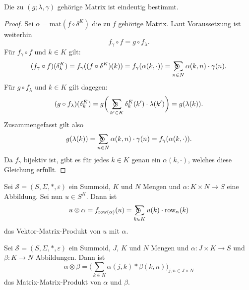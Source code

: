 \documentclass{article}
\DeclareMathOperator*{\sumcirc}{%
  \ThisStyle{\mathop{\ensurestackMath{\stackinset{c}{-1.5\LMpt}{c}{}{%
  \rotatebox[origin=lb]{-90}{$\SavedStyle\scalerel*{\bm\Circle}{%
  i}$}}{\SavedStyle\sum}}}}}
\begin{document}
\begin{theorem}
  Die zu $(g;\lambda, \gamma)$ gehörige Matrix ist eindeutig bestimmt.
\end{theorem}
\begin{proof}
  Sei $\alpha = \text{mat}(f \circ \delta^K)$ die zu $f$ gehörige Matrix.
  Laut Voraussetzung ist weiterhin
  \begin{equation*}
    f_\gamma \circ f = g \circ f_\lambda.
  \end{equation*}
  Für $f_\gamma \circ f$ und $k \in K$ gilt:
  \begin{equation*}
    (f_\gamma \circ f)(\delta^K_k)
    = f_\gamma((f \circ \delta^K)(k))
    = f_\gamma(\alpha(k, \cdot))
    = \sumcirc_{n \in N}\alpha(k, n) \cdot \gamma(n).
  \end{equation*}
  Für $g \circ f_\lambda$ und $k \in K$ gilt dagegen:
  \begin{equation*}
    (g \circ f_\lambda)(\delta^K_k)
    = g \bigg( \sumcirc_{k' \in K} \delta^K_k(k') \cdot \lambda(k') \bigg)
    = g(\lambda(k)).
  \end{equation*}
  Zusammengefasst gilt also
  \begin{equation*}
    g(\lambda(k)) = \sumcirc_{n \in N}\alpha(k, n) \cdot \gamma(n) = f_\gamma(\alpha(k, \cdot)).
  \end{equation*}
  Da $f_\gamma$ bijektiv ist, gibt es für jedes $k \in K$ genau ein $\alpha(k, \cdot)$,
  welches diese Gleichung erfüllt.
\end{proof}

\begin{definition}
  Sei $\mathcal{S} = (S, \Sigma, \ast, \varepsilon)$ ein Summoid,
  $K$ und $N$ Mengen und
  $\alpha \colon K \times N \to S$ eine Abbildung.
  Sei nun $u \in S^K$. Dann ist
  \begin{equation*}
    u \otimes \alpha = f_{\text{row}(\alpha)}(u) = \sumcirc_{k \in K}u(k) \cdot \text{row}_\alpha(k)
  \end{equation*}
  das Vektor-Matrix-Produkt von $u$ mit $\alpha$.
\end{definition}

\begin{definition}
  Sei $\mathcal{S} = (S, \Sigma, \ast, \varepsilon)$ ein Summoid,
  $J$, $K$ und $N$ Mengen und
  $\alpha \colon J \times K \to S$ und $\beta \colon K \to N$ Abbildungen.
  Dann ist
  \begin{equation*}
    \alpha \otimes \beta = \Bigg(\sum_{k \in K} \alpha(j, k) \ast \beta(k, n) \Bigg)_{j, n \in J \times N}
  \end{equation*}
  das Matrix-Matrix-Produkt von $\alpha$ und $\beta$.
\end{definition}
\end{document}
